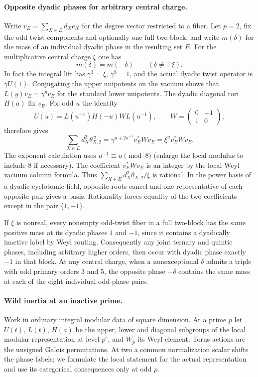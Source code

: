 \documentclass[11pt,a4paper]{article}
\numberwithin{equation}{section}
\theoremstyle{remark}
\begin{document}
\paragraph{Opposite dyadic phases for arbitrary central charge.}
Write $v_E=\sum_{X\in E}d_X e_X$ for the degree vector restricted to a fiber. Let $p=2$, fix the odd twist components and optionally one full
two-block, and write $m(\delta)$ for the mass of an individual dyadic
phase in the resulting set $E$. For the multiplicative central charge
$\xi$ one has
\[
            m(\delta)=m(-\delta)\qquad(\delta\ne\pm\xi).
\]
In fact the integral lift has $\gamma^3=\xi$, $\gamma^8=1$,
and the actual dyadic twist operator is $\gamma U(1)$.
Conjugating the upper unipotents on the vacuum shows that
$L(y)v_E=\gamma^y v_E$ for the standard lower unipotents.
The dyadic diagonal tori $H(a)$ fix $v_E$. For odd $u$ the identity
\[
 U(u)=L(u^{-1})H(-u)W L(u^{-1}),\qquad
 W=\begin{pmatrix}0&-1\\1&0\end{pmatrix},
\]
therefore gives
\[
   \sum_{X\in E}d_X^2\theta_{X,2}^{\,u}
        =\gamma^{u+2u^{-1}}v_E^*Wv_E=\xi^u v_E^*Wv_E .
\]
The exponent calculation uses $u^{-1}\equiv u\pmod8$ (enlarge the
local modulus to include $8$ if necessary). The coefficient
$v_E^*Wv_E$ is an integer by the local Weyl vacuum column formula.
Thus $\sum_{X\in E}d_X^2\theta_{X,2}/\xi$ is rational. In the power
basis of a dyadic cyclotomic field, opposite roots cancel and one
representative of each opposite pair gives a basis. Rationality
forces equality of the two coefficients except in the pair $\{1,-1\}$.

If $\xi$ is nonreal, every nonempty odd-twist fiber in a full
two-block has the same positive mass at its dyadic phases $1$ and
$-1$, since it contains a dyadically inactive label by Weyl routing.
Consequently any joint ternary and quintic phases, including arbitrary
higher orders, then occur with dyadic phase exactly $-1$ in that block.
At any central charge, when a nonexceptional $\delta$ admits a
triple with odd primary orders $3$ and $5$, the opposite phase $-\delta$
contains the same mass at each of the eight individual odd-phase pairs.

\paragraph{Wild inertia at an inactive prime.}
Work in ordinary integral modular data of square dimension. At a prime $p$ let $U(t)$, $L(t)$, $H(a)$ be the upper, lower and diagonal subgroups of the local modular representation at level $p^e$, and $W_p$ its Weyl element. Torus actions are the unsigned Galois permutations. At two a common normalization scalar shifts the phase labels; we formulate the local statement for the actual representation and use its categorical consequences only at odd $p$.
\end{document}
